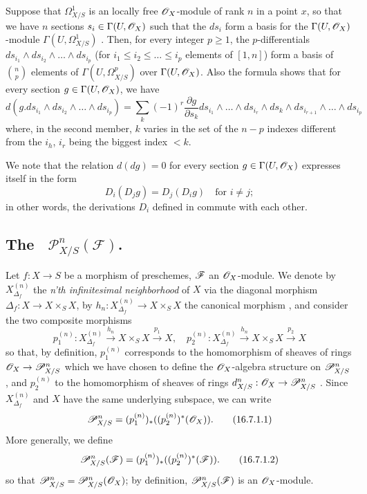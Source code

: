 \begin{env}[16.6.5]
\label{IV.16.6.5}
Suppose that $\Omega_{X/S}^1$ is an locally free $\mathscr{O}_X$-module of rank $n$ in a point $x$, so that we have $n$ sections $s_i \in \Gamma(U, \mathscr{O}_X)$ such that the $ds_i$ form a basis for the $\Gamma(U, \mathscr{O}_X)$-module $\Gamma(U, \Omega_{X/S}^1)$ .
Then, for every integer $p \geq 1$, the $p$-differentials $ds_{i_1} \wedge ds_{i_2} \wedge \dots \wedge ds_{i_p}$ (for $i_1 \leq i_2 \leq \dots \leq i_p$ elements of $[1,n]$) form a basis of $\binom{n}{p}$ elements of $\Gamma(U, \Omega_{X/S}^p)$ over $\Gamma(U, \mathscr{O}_X)$.
Also the formula  shows that for every section $g \in \Gamma(U, \mathscr{O}_X)$, we have
\[
  \label{IV.16.6.5.1}
  d(g.ds_{i_1} \wedge ds_{i_2} \wedge \dots \wedge ds_{i_p}) = \sum_k (-1)^r \frac{\partial g}{\partial s_k} ds_{i_1} \wedge \dots \wedge ds_{i_r} \wedge ds_k \wedge ds_{i_{r+1}} \wedge \dots \wedge ds_{i_p}
  \tag{16.6.5.1}
\]
where, in the second member, $k$ varies in the set of the $n - p$ indexes different from the $i_h$, $i_r$ being the biggest index $<k$.

We note that the relation $d(dg) = 0$ for every section $g \in \Gamma(U, \mathscr{O}_X)$ expresses itself in the form
\[
  D_i(D_j g) = D_j(D_i g) \quad \text{for $i \neq j$};
\]
in other words, the derivations $D_i$ defined in  commute with each other.
\end{env}

\subsection{The ~$\mathcal{P}_{X/S}^n(\mathcal{F})$.}
\label{IV.16.7}

\begin{env}[16.7.1]
\label{IV.16.7.1}
Let $f:X \to S$ be a morphism of preschemes, $\mathscr{F}$ an $\mathscr{O}_X$-module.
We denote by $X_{\Delta_f}^{(n)}$ the \emph{n'th infinitesimal neighborhood} of $X$ via the diagonal morphism
$\Delta_f: X \to X \times_S X$, by $h_n:X_{\Delta_f}^{(n)} \to X \times_S X$ the canonical morphism , and consider the two composite morphisms
\[
  p_1^{(n)}:X_{\Delta_f}^{(n)} \xrightarrow{h_n} X \times_S X \xrightarrow{p_1} X, \quad 
  p_2^{(n)}:X_{\Delta_f}^{(n)} \xrightarrow{h_n} X \times_S X \xrightarrow{p_2} X
\]
so that, by definition, $p_1^{(n)}$ corresponds to the homomorphism of sheaves of rings $\sh{O}_X \to \sh{P}_{X/S}^n$ which we have chosen to define the $\mathscr{O}_X$-algebra structure on $\mathscr{P}_{X/S}^n$ , and $p_2^{(n)}$ to the homomorphism of sheaves of rings $d^n_{X/S}:\sh{O}_X \to \sh{P}_{X/S}^n$ .
Since $X_{\Delta_f}^{(n)}$ and $X$ have the same underlying subspace, we can write
\[
  \label{IV.16.7.1.1}
  \mathscr{P}_{X/S}^n = (p_1^{(n)})_* ((p_2^{(n)})^* (\mathscr{O}_X)).
  \tag{16.7.1.1}
\]
More generally, we define
\[
  \label{IV.16.7.1.2}
  \mathscr{P}_{X/S}^n(\mathscr{F}) = (p_1^{(n)})_* ((p_2^{(n)})^* (\mathscr{F})).
  \tag{16.7.1.2}
\]
so that $\mathscr{P}_{X/S}^n = \mathscr{P}_{X/S}^n(\mathscr{O}_X)$;
by definition, $\mathscr{P}_{X/S}^n(\mathscr{F})$ is an $\mathscr{O}_X$-module.
\end{env}

